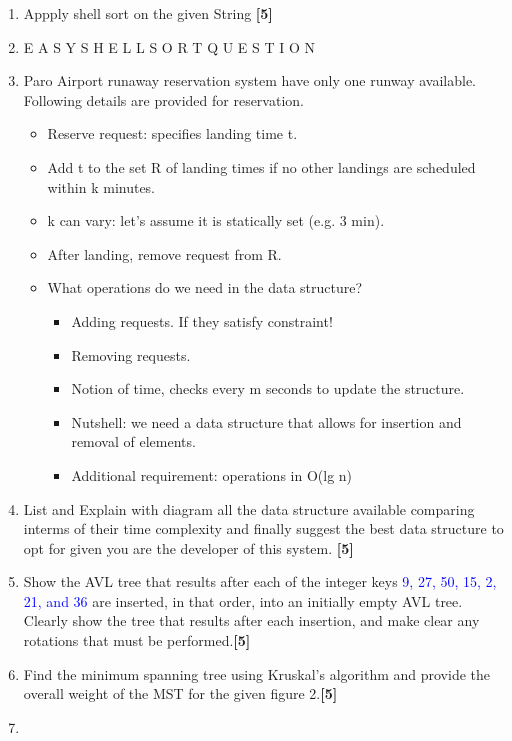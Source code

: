 \documentclass[12pt ,a4paper]{exam}
\begin{document}
	\begin{enumerate}[start=1,label={\bfseries Q\arabic*)}]
	\item Appply shell sort on the given String \hfill\textbf{[5]} 
	\item [] E A S Y S H E L L S O R T Q U E S T I O N
	
	\item Paro Airport runaway reservation system have only one runway available. Following details are provided for reservation. 
	\begin{itemize}
		\item Reserve request: specifies landing time t.
		\item Add t to the set R of landing times if no other landings are
		scheduled within k minutes.
		\item k can vary: let’s assume it is statically set (e.g. 3 min). 
		\item After landing, remove request from R.
		\item What operations do we need in the data structure?
			\begin{itemize}
				\item Adding requests. If they satisfy constraint!
				\item Removing requests.
				\item Notion of time, checks every m seconds to update the structure.
				\item Nutshell: we need a data structure that allows for insertion and removal of elements.
				\item Additional requirement: operations in O(lg n)
			\end{itemize}
	\end{itemize}
	\item [] List and Explain with diagram all the data structure available comparing interms of their time complexity and finally suggest the best data structure to opt for given you are the developer of this system.  \hfill\textbf{[5]}
	\item Show the AVL tree that results after each of the integer keys \textcolor{blue}{ 9, 27, 50, 15, 2, 21, and 36} are inserted, in that order, into an initially empty AVL tree. Clearly show the tree that results after each insertion, and make clear any rotations that must be performed.\hfill\textbf{[5]} 
	\item Find the minimum spanning tree using Kruskal’s algorithm and provide the overall weight of the MST for the given figure 2.\hfill\textbf{[5]}
	\item []

\end{enumerate}
\end{document}

